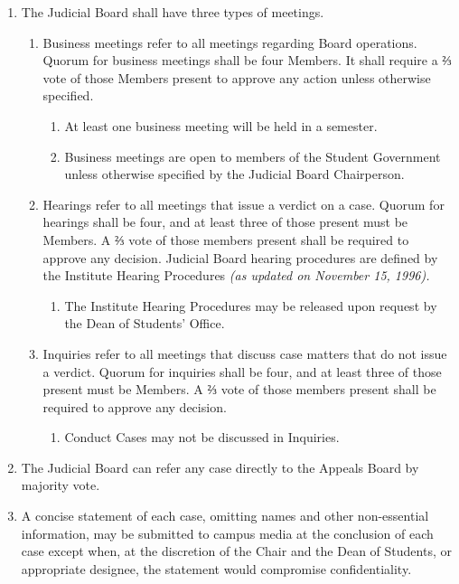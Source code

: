 \begin{enumerate}
  \item The Judicial Board shall have three types of meetings.
  \begin{enumerate}
    \item Business meetings refer to all meetings regarding Board operations. Quorum for business meetings shall be four Members. It shall require a ⅔ vote of those Members present to approve any action unless otherwise specified.
      \begin{enumerate}
        \item At least one business meeting will be held in a semester.
        \item Business meetings are open to members of the Student Government unless otherwise specified by the Judicial Board Chairperson.
      \end{enumerate}
    \item Hearings refer to all meetings that issue a verdict on a case. Quorum for hearings shall be four, and at least three of those present must be Members. A ⅔ vote of those members present shall be required to approve any decision. Judicial Board hearing procedures are defined by the Institute Hearing Procedures \textit{(as updated on November 15, 1996).}
      \begin{enumerate}
        \item The Institute Hearing Procedures may be released upon request by the Dean of Students' Office.
      \end{enumerate}
    \item Inquiries refer to all meetings that discuss case matters that do not issue a verdict. Quorum for inquiries shall be four, and at least three of those present must be Members. A ⅔ vote of those members present shall be required to approve any decision.
      \begin{enumerate}
        \item Conduct Cases may not be discussed in Inquiries.
      \end{enumerate}
  \end{enumerate}
  \item The Judicial Board can refer any case directly to the Appeals Board by majority vote.
  \item A concise statement of each case, omitting names and other non-essential information, may be submitted to campus media at the conclusion of each case except when, at the discretion of the Chair and the Dean of Students, or appropriate designee, the statement would compromise confidentiality.
\end{enumerate}


